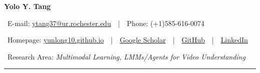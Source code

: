 \documentclass{resume}
\begin{document}

    {\fontsize{18}{18}\selectfont\textbf{Yolo Y. Tang}}


~E-mail: \href{mailto:ytang37@ur.rochester.edu}{ytang37@ur.rochester.edu}~~|~~Phone: (+1)585-616-0074

~Homepage: \href{https://yunlong10.github.io/}{yunlong10.github.io}~~|~~\href{https://scholar.google.com/citations?user=xf1rCgoAAAAJ}{Google Scholar}~~|~~\href{https://github.com/yunlong10}{GitHub}~~|~~\href{https://www.linkedin.com/in/yunlong-yolo-tang/}{LinkedIn}

~Research Area: \textit{Multimodal Learning, LMMs/Agents for Video Understanding}

\vspace{10pt}
\hrule







\end{document}
